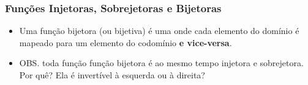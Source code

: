 \documentclass[usenames,dvipsnames,svgnames]{beamer}
\begin{document}
\begin{frame}	
	\frametitle{Funções Injetoras, Sobrejetoras e Bijetoras}

	\begin{itemize}
		\item Uma função bijetora (ou bijetiva) é uma onde cada elemento do domínio é mapeado para um elemento do codomínio \textbf{e vice-versa}.
		\item OBS. toda função função bijetora é ao mesmo tempo injetora e sobrejetora. Por quê? Ela é invertível à esquerda ou à direita?
	\end{itemize}

	\begin{adjustbox}{max totalsize={\textwidth}{.65\textheight},center}
	\end{adjustbox}
\end{frame}
\end{document}
